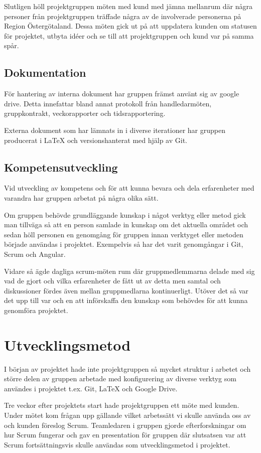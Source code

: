 Slutligen höll projektgruppen möten med kund med jämna mellanrum där några personer från projektgruppen träffade några av de involverade personerna på Region Östergötaland. Dessa möten gick ut på att uppdatera kunden om statusen för projektet, utbyta idéer och se till att projektgruppen och kund var på samma spår.

\subsection{Dokumentation}
För hantering av interna dokument har gruppen främst använt sig av google drive. Detta innefattar bland annat protokoll från handledarmöten, gruppkontrakt, veckorapporter och tidsrapportering.

Externa dokument som har lämnats in i diverse iterationer har gruppen producerat i LaTeX och versionshanterat med hjälp av Git.

\subsection{Kompetensutveckling}
Vid utveckling av kompetens och för att kunna bevara och dela erfarenheter med varandra har gruppen arbetat på några olika sätt.

Om gruppen behövde grundläggande kunskap i något verktyg eller metod gick man tillväga så att en person samlade in kunskap om det aktuella området och sedan höll personen en genomgång för gruppen innan verktyget eller metoden började användas i projektet. Exempelvis så har det varit genomgångar i Git, Scrum och Angular. 

Vidare så ägde dagliga scrum-möten rum där gruppmedlemmarna delade med sig vad de gjort och vilka erfarenheter de fått ut av detta men samtal och diskussioner fördes även mellan gruppmedlarna kontinuerligt. Utöver det så var det upp till var och en att införskaffa den kunskap som behövdes 
för att kunna genomföra projektet.  

\section{Utvecklingsmetod}
I början av projektet hade inte projektgruppen så mycket struktur i arbetet och större delen av gruppen arbetade med konfigurering av diverse verktyg som användes i projektet t.ex. Git, LaTeX och Google Drive.

Tre veckor efter projektets start hade projektgruppen ett möte med kunden. Under mötet kom frågan upp gällande vilket arbetssätt vi skulle använda oss av och kunden föreslog Scrum. Teamledaren i gruppen gjorde efterforskningar om hur Scrum fungerar och gav en presentation för gruppen där slutsatsen var att Scrum fortsättningsvis skulle användas som utvecklingsmetod i projektet.

